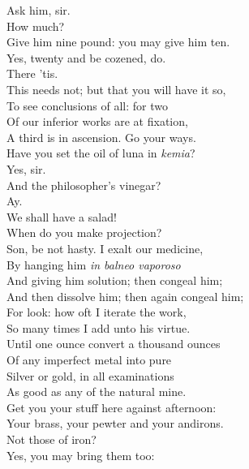 \documentclass[a4paper,oneside,12pt]{memoir}
\begin{document}
\begin{drama*}
\facespeaks {} Ask him, sir.\\
\mammonspeaks How much?\\
\subtlespeaks {} Give him nine pound: you may give him ten.\\
\surlyspeaks Yes, twenty and be cozened, do.\\
\mammonspeaks {} There 'tis.\\
\subtlespeaks This needs not; but that you will have it so,\\
To see conclusions of all: for two\\
Of our inferior works are at fixation,\\
A third is in ascension. Go your ways.\\
Have you set the oil of luna in \emph{kemia}?\\
\facespeaks Yes, sir.\\
\subtlespeaks {} And the philosopher's vinegar?\\
\facespeaks {} Ay.\\
\surlyspeaks We shall have a salad!\\
\mammonspeaks {} When do you make projection?\\
\subtlespeaks Son, be not hasty. I exalt our medicine,\\
By hanging him \emph{in balneo vaporoso}\\
And giving him solution; then congeal him;\\
And then dissolve him; then again congeal him;\\
For look: how oft I iterate the work,\\
So many times I add unto his virtue.\\
Until one ounce convert a thousand ounces\\
Of any imperfect metal into pure\\
Silver or gold, in all examinations\\
As good as any of the natural mine.\\
Get you your stuff here against afternoon:\\
Your brass, your pewter and your andirons.\\
\mammonspeaks Not those of iron?\\
\subtlespeaks {} Yes, you may bring them too:\\

\end{drama*}
\end{document}
